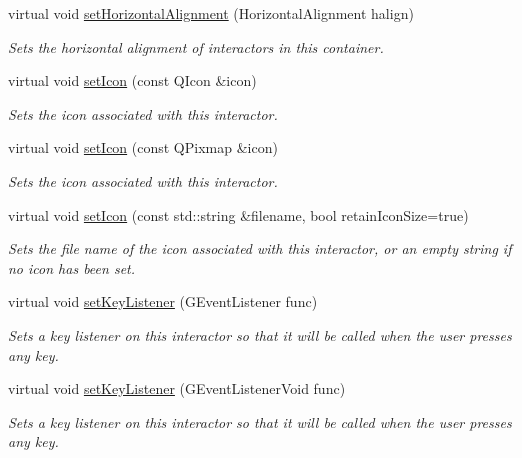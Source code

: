 \begin{DoxyCompactItemize}
virtual void \mbox{\hyperlink{classGContainer_a901653aacb9991ee9a8b70d4a932f0c9}{set\+Horizontal\+Alignment}} (Horizontal\+Alignment halign)
\begin{DoxyCompactList}\small\item\em Sets the horizontal alignment of interactors in this container. \end{DoxyCompactList}\item 
virtual void \mbox{\hyperlink{classGInteractor_a542abfcd7261751352af129c7215ecda}{set\+Icon}} (const Q\+Icon \&icon)
\begin{DoxyCompactList}\small\item\em Sets the icon associated with this interactor. \end{DoxyCompactList}\item 
virtual void \mbox{\hyperlink{classGInteractor_a368e1a338f84401c284506d03b1ba769}{set\+Icon}} (const Q\+Pixmap \&icon)
\begin{DoxyCompactList}\small\item\em Sets the icon associated with this interactor. \end{DoxyCompactList}\item 
virtual void \mbox{\hyperlink{classGInteractor_a762e139aa311461c3984d3ad28293f64}{set\+Icon}} (const std\+::string \&filename, bool retain\+Icon\+Size=true)
\begin{DoxyCompactList}\small\item\em Sets the file name of the icon associated with this interactor, or an empty string if no icon has been set. \end{DoxyCompactList}\item 
virtual void \mbox{\hyperlink{classGInteractor_aeb8324d3287fa1fbe093f4d6230cf0a6}{set\+Key\+Listener}} (G\+Event\+Listener func)
\begin{DoxyCompactList}\small\item\em Sets a key listener on this interactor so that it will be called when the user presses any key. \end{DoxyCompactList}\item 
virtual void \mbox{\hyperlink{classGInteractor_ae48ecea73606c7bd9423e1c7cc589cc9}{set\+Key\+Listener}} (G\+Event\+Listener\+Void func)
\begin{DoxyCompactList}\small\item\em Sets a key listener on this interactor so that it will be called when the user presses any key. \end{DoxyCompactList}\item 

\end{DoxyCompactItemize}
